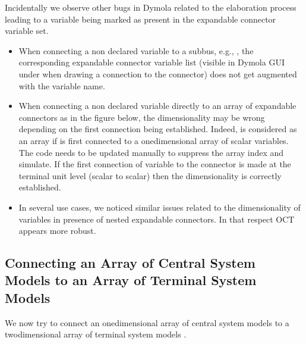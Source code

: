 \documentclass[letterpaper,10pt, openany,english]{sphinxmanual}
\begin{document}

Incidentally we observe other bugs in Dymola related to the elaboration process leading to a variable being marked as present in the expandable connector variable set.
\begin{itemize}
\item {} 
When connecting a non declared variable to a sub\sphinxhyphen{}bus, e.g., , the corresponding expandable connector variable list (visible in Dymola GUI under  when drawing a connection to the connector) does not get augmented with the variable name.

\item {} 
When connecting a non declared variable directly to an array of expandable connectors as in the figure below, the dimensionality may be wrong depending on the first connection being established. Indeed,  is considered as an array if  is first connected to a one\sphinxhyphen{}dimensional array of scalar variables. The code needs to be updated manually to suppress the array index and simulate. If the first connection of  variable to the connector is made at the terminal unit level (scalar to scalar) then the dimensionality is correctly established.

\item {} 
In several use cases, we noticed similar issues related to the dimensionality of variables in presence of nested expandable connectors. In that respect OCT appears more robust.

\end{itemize}

\begin{figure}[htbp]
\centering

\noindent{}
\end{figure}


\subsection{Connecting an Array of Central System Models to an Array of Terminal System Models}
\label{\detokenize{annex:connecting-an-array-of-central-system-models-to-an-array-of-terminal-system-models}}
We now try to connect an one\sphinxhyphen{}dimensional array of central system models  to a two\sphinxhyphen{}dimensional array of terminal system models .
\end{document}
